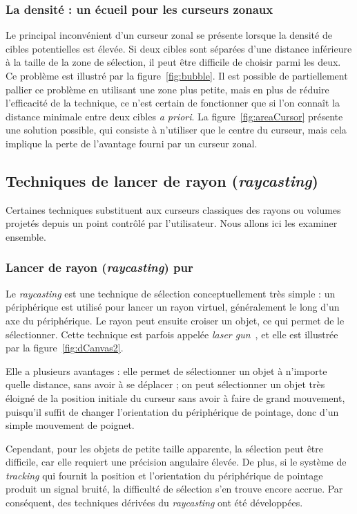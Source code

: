 	\subsubsection{La densité : un écueil pour les curseurs zonaux}
	Le principal inconvénient d'un curseur zonal se présente lorsque la densité de cibles potentielles est élevée. Si deux cibles sont séparées d'une distance inférieure à la taille de la zone de sélection, il peut être difficile de choisir parmi les deux. Ce problème est illustré par la figure~\ref{fig:bubble}. Il est possible de partiellement pallier ce problème en utilisant une zone plus petite, mais en plus de réduire l'efficacité de la technique, ce n'est certain de fonctionner que si l'on connaît la distance minimale entre deux cibles \emph{a priori}. La figure~\ref{fig:areaCursor} présente une solution possible, qui consiste à n'utiliser que le centre du curseur, mais cela implique la perte de l'avantage fourni par un curseur zonal.
	
	\subsection{Techniques de lancer de rayon (\emph{raycasting})}
	Certaines techniques substituent aux curseurs classiques des rayons ou volumes projetés depuis un point contrôlé par l'utilisateur. Nous allons ici les examiner ensemble.

	\subsubsection{Lancer de rayon (\emph{raycasting}) pur}
	Le \emph{raycasting} est une technique de sélection conceptuellement très simple : un périphérique est utilisé pour lancer un rayon virtuel, généralement le long d'un axe du périphérique. Le rayon peut ensuite croiser un objet, ce qui permet de le sélectionner. Cette technique est parfois appelée \emph{laser gun}~\cite{liang1994jdcad}, et elle est illustrée par la figure~\ref{fig:dCanvas2}.
	
	Elle a plusieurs avantages : elle permet de sélectionner un objet à n'importe quelle distance, sans avoir à se déplacer ; on peut sélectionner un objet très éloigné de la position initiale du curseur sans avoir à faire de grand mouvement, puisqu'il suffit de changer l'orientation du périphérique de pointage, donc d'un simple mouvement de poignet.
	
	Cependant, pour les objets de petite taille apparente, la sélection peut être difficile, car elle requiert une précision angulaire élevée. De plus, si le système de \emph{tracking} qui fournit la position et l'orientation du périphérique de pointage produit un signal bruité, la difficulté de sélection s'en trouve encore accrue. Par conséquent, des techniques dérivées du \emph{raycasting} ont été développées.
	
